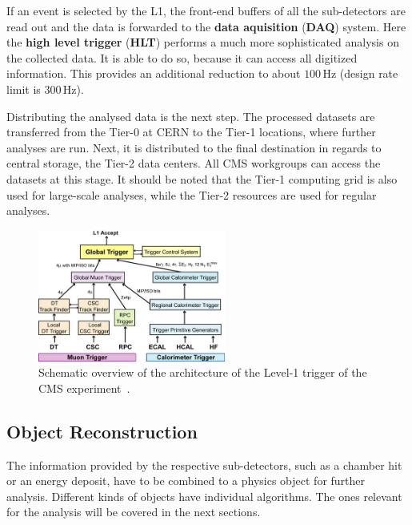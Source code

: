 If an event is selected by the L1, the front-end buffers of all the sub-detectors are read out and the data is forwarded to the \textbf{data aquisition} (\textbf{DAQ}) system. Here the \textbf{high level trigger} (\textbf{HLT}) performs a much more sophisticated analysis on the collected data. It is able to do so, because it can access all digitized information. This provides an additional reduction to about $100\,\text{Hz}$ (design rate limit is $300\,\text{Hz}$).

Distributing the analysed data is the next step. The processed datasets are transferred from the Tier-0 at CERN to the Tier-1 locations, where further analyses are run. Next, it is distributed to the final destination in regards to central storage, the Tier-2 data centers. All CMS workgroups can access the datasets at this stage. It should be noted that the Tier-1 computing grid is also used for large-scale analyses, while the Tier-2 resources are used for regular analyses.


\begin{figure}[ht!]
  \centering
  \includegraphics[width=0.55\textwidth]{plots/lvl1trigger.jpg}
  \caption{Schematic overview of the architecture of the Level-1 trigger of the CMS experiment~\cite{cmsjinst}.}
  \label{fig:lvl1trig}
\end{figure}


\subsection{Object Reconstruction}
\label{sec:objreco}

The information provided by the respective sub-detectors, such as a chamber hit or an energy deposit, have to be combined to a physics object for further analysis. Different kinds of objects have individual algorithms. The ones relevant for the analysis will be covered in the next sections. \\

